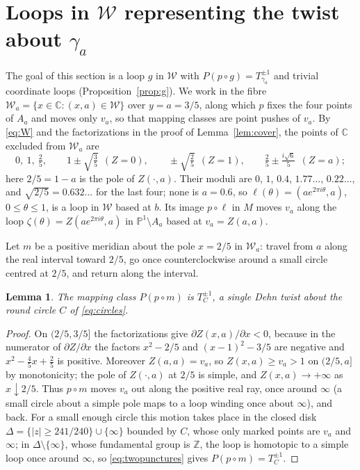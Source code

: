 \documentclass[11pt]{article}
\newcommand{\Pone}{\mathbb P^1}
\newcommand{\C}{\mathbb C}
\newcommand{\Z}{\mathbb Z}
\newcommand{\W}{\mathcal W}
\newtheorem{lemma}[theorem]{Lemma}
\theoremstyle{remark}
\numberwithin{equation}{section}
\begin{document}
\section{Loops in \texorpdfstring{$\W$}{W} representing the twist about
\texorpdfstring{$\gamma_a$}{gamma\_a}}\label{sec:loops}

The goal of this section is a loop $g$ in $\W$ with
$P(p\circ g)=T_{\gamma_a}^{\pm1}$ and trivial coordinate loops
(Proposition~\ref{prop:g}). We work in the fibre
$\W_a=\{x\in\C:(x,a)\in\W\}$ over $y=a=3/5$, along which $p$ fixes the
four points of $A_a$ and moves only $v_a$, so that mapping classes are
point pushes of $v_a$. By \eqref{eq:W} and the
factorizations in the proof of Lemma~\ref{lem:cover}, the points of $\C$
excluded from $\W_a$ are
\begin{equation}\label{eq:forbidden}
 0,\ 1,\ \tfrac25,\qquad
 1\pm\sqrt{\tfrac35}\ \ (Z=0),\qquad
 \pm\sqrt{\tfrac25}\ \ (Z=1),\qquad
 \tfrac25\pm\tfrac{i\sqrt6}{5}\ \ (Z=a);
\end{equation}
here $2/5=1-a$ is the pole of $Z(\cdot,a)$. Their moduli are
$0$, $1$, $0.4$, $1.77\ldots$, $0.22\ldots$, and $\sqrt{2/5}=0.632\ldots$
for the last four; none is $a=0.6$, so
$\ell(\theta)=(ae^{2\pi i\theta},a)$, $0\le\theta\le1$, is a loop in $\W$
based at $b$. Its image $p\circ\ell$ in $M$ moves $v_a$ along the loop
$\zeta(\theta)=Z(ae^{2\pi i\theta},a)$ in $\Pone\setminus A_a$ based at
$v_a=Z(a,a)$.

Let $m$ be a positive meridian about the pole $x=2/5$ in $\W_a$: travel
from $a$ along the real interval toward $2/5$, go once counterclockwise
around a small circle centred at $2/5$, and return along the interval.

\begin{lemma}\label{lem:m}
The mapping class $P(p\circ m)$ is $T_C^{\pm1}$, a single Dehn twist about
the round circle $C$ of \eqref{eq:circles}.
\end{lemma}

\begin{proof}
On $(2/5,3/5]$ the factorizations give $\partial Z(x,a)/\partial x<0$,
because in the numerator of $\partial Z/\partial x$ the factors $x^2-2/5$
and $(x-1)^2-3/5$ are negative and $x^2-\frac45x+\frac25$ is positive.
Moreover $Z(a,a)=v_a$, so $Z(x,a)\ge v_a>1$ on $(2/5,a]$ by
monotonicity; the pole of $Z(\cdot,a)$
at $2/5$ is simple, and $Z(x,a)\to+\infty$ as
$x\downarrow2/5$. Thus $p\circ m$ moves $v_a$ out along the positive real
ray, once around $\infty$ (a small circle about a simple pole maps to a
loop winding once about $\infty$), and back. For a small enough circle this motion takes place in the closed disk
$\Delta=\{|z|\ge241/240\}\cup\{\infty\}$ bounded by $C$, whose only marked
points are $v_a$ and $\infty$; in $\Delta\setminus\{\infty\}$, whose
fundamental group is $\Z$, the loop is homotopic to a simple loop once
around $\infty$, so \eqref{eq:twopunctures} gives $P(p\circ m)=T_C^{\pm1}$.
\end{proof}
\end{document}
